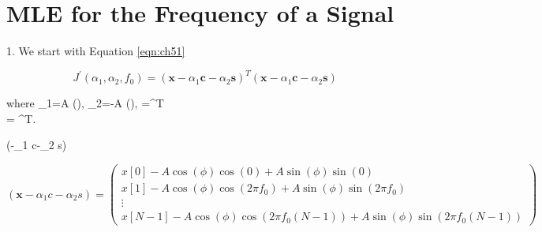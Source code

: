 
\section{MLE for the Frequency of a Signal}


1. We start with Equation \ref{eqn:ch51}

\begin{equation}
    J^{\prime}\left(\alpha_{1}, \alpha_{2}, f_{0}\right)=\left(\mathbf{x}-\alpha_{1} \mathbf{c}-\alpha_{2} \mathbf{s}\right)^{T}\left(\mathbf{x}-\alpha_{1} \mathbf{c}-\alpha_{2} \mathbf{s}\right)
    \label{eqn:ch51}
\end{equation}

\noindent
where \alpha_{1}=A \cos (\phi), \alpha_{2}=-A \sin (\phi), =^{T}    \\= ^{T}.

\noindent
\left(-\alpha_{1} c-\alpha_{2} s\right) 
\vspace{-0.2cm}
\begin{center}
\begin{equation}
\left(\boldsymbol{x}-\alpha_{1} c-\alpha_{2} s\right)=
\left(\begin{array}{c}
x[0]-A \cos (\phi) \cos (0)+A \sin (\phi) \sin (0) \\
x[1]-A \cos (\phi) \cos \left(2 \pi f_{0}\right)+A \sin (\phi) \sin \left(2 \pi f_{0}\right) \\
\vdots \\
x[N-1]-A \cos (\phi) \cos \left(2 \pi f_{0}(N-1)\right)+A \sin (\phi) \sin \left(2 \pi f_{0}(N-1)\right)
\end{array}\right)
\label{eqn:ch52}
\end{equation}
\end{center}

\noindent
\begin{flushleft}
\end{flushleft}


